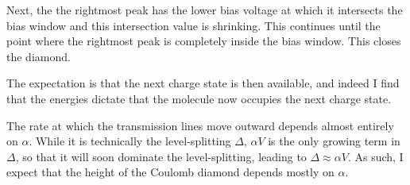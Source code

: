 Next, the the rightmost peak has the lower bias voltage at which it intersects the bias window and this intersection value is shrinking. This continues until the point where the rightmost peak is completely inside the bias window. This closes the diamond. 

The expectation is that the next charge state is then available, and indeed I find that the energies dictate that the molecule now occupies the next charge state.

The rate at which the transmission lines move outward depends almost entirely on $\alpha$. While it is technically the level-splitting $\Delta$, $\alpha V$ is the only growing term in $\Delta$, so that it will soon dominate the level-splitting, leading to $\Delta \approx \alpha V$. As such, I expect that the height of the Coulomb diamond depends mostly on $\alpha$. 

